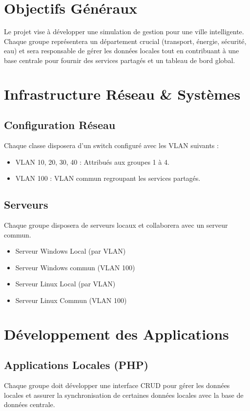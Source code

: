 \documentclass[a4paper,12pt]{report}
\begin{document}
\chapter{Objectifs Généraux}
Le projet vise à développer une simulation de gestion pour une ville intelligente. Chaque groupe représentera un département crucial (transport, énergie, sécurité, eau) et sera responsable de gérer les données locales tout en contribuant à une base centrale pour fournir des services partagés et un tableau de bord global.

\chapter{Infrastructure Réseau \& Systèmes}
\section{Configuration Réseau}
Chaque classe disposera d'un switch configuré avec les VLAN suivants :
\begin{itemize}
    \item VLAN 10, 20, 30, 40 : Attribués aux groupes 1 à 4.
    \item VLAN 100 : VLAN commun regroupant les services partagés.
\end{itemize}

\section{Serveurs}
Chaque groupe disposera de serveurs locaux et collaborera avec un serveur commun.
\begin{itemize}
    \item Serveur Windows Local (par VLAN)
    \item Serveur Windows commun (VLAN 100)
    \item Serveur Linux Local (par VLAN)
    \item Serveur Linux Commun (VLAN 100)
\end{itemize}

\chapter{Développement des Applications}
\section{Applications Locales (PHP)}
Chaque groupe doit développer une interface CRUD pour gérer les données locales et assurer la synchronisation de certaines données locales avec la base de données centrale.
\end{document}
